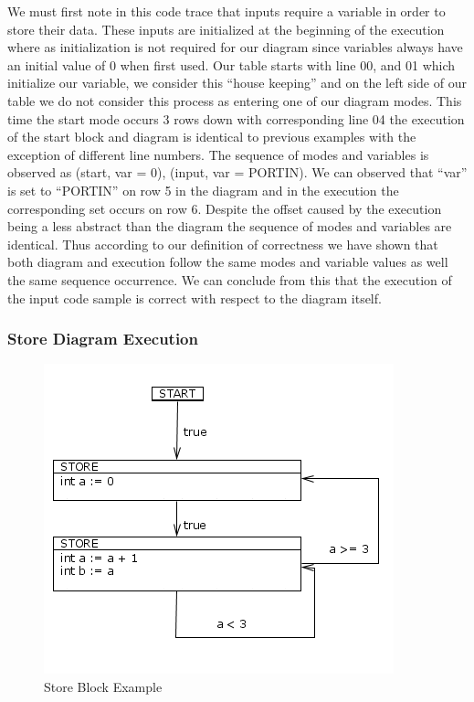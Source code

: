 We must first note in this code trace that inputs require a variable in order to store
their data. These inputs are initialized at the beginning of the execution where as 
initialization is not required for our diagram since variables always have an initial
value of 0 when first used. Our table starts with line 00, and 01 which initialize 
our variable, we consider this ``house keeping'' and on the left side of our table we
do not consider this process as entering one of our diagram modes. This time the start
mode occurs 3 rows down with corresponding line 04 the execution of the start block 
and diagram is identical to previous examples with the exception of different line numbers.
The sequence of modes and variables is observed as {(start, var = 0), (input, var = PORTIN)}.
We can observed that ``var'' is set to ``PORTIN'' on row 5 in the diagram and in the 
execution the corresponding set occurs on row 6. Despite the offset caused by the execution
being a less abstract than the diagram the sequence of modes and variables are identical.
Thus according to our definition of correctness we have shown that both diagram
and execution follow the same modes and variable values as well the same sequence
occurrence. We can conclude from this that the execution of the input code sample is correct
with respect to the diagram itself.

\clearpage
\subsubsection{Store Diagram Execution}

\begin{figure}[h]
	\centering
	\includegraphics[width=\imgmedphoto]{./images/correctness_ex_store.png}
	\caption{Store Block Example}
	\label{fig:correctness_ex_store}
\end{figure}


